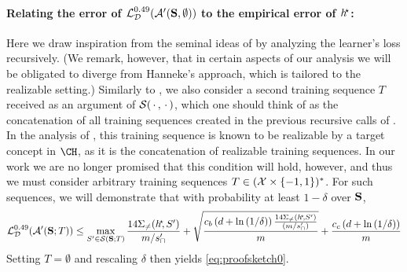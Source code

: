 {}

\paragraph{Relating the error of $ \operatorname{\mathcal{L}}_{\mathcal{D}}^{0.49}(\mathcal{A}'(\mathbf{S},\emptyset)) $ to the empirical error of $ h^{\negmedspace\star} $:}
Here we draw inspiration from the seminal ideas of \cite{hanneke2016optimal} by analyzing the learner's loss recursively. (We remark, however, that in certain aspects of our analysis we will be obligated to diverge from Hanneke's approach, which is tailored to the realizable setting.) 
Similarly to \citet{hanneke2016optimal}, we also consider a second training sequence $T$ received as an argument of $ \mathcal{S}(\, \cdot \,, \, \cdot \,) $, which one should think of as the concatenation of all training sequences created in the previous recursive calls of . 
In the analysis of \cite{hanneke2016optimal}, this training sequence is known to be realizable by a target concept in $\CH$, as it is the concatenation of realizable training sequences. 
In our work we are no longer promised that this condition will hold, however, and thus we must consider arbitrary training sequences $ T\in (\mathcal{X}\times \{-1,1  \} )^{*}$. For such sequences,
 we will demonstrate that with probability at least $ 1-\delta $ over $ \mathbf{S} $, 
\begin{align}\label{eq:proofsketch3}
    \operatorname{\mathcal{L}}_{\mathcal{D}}^{0.49}(\mathcal{A}'(\mathbf{S};T))
    \leq  \max\limits_{S'\in\mathcal{S}(\mathbf{S};T)}\frac{14\Sigma_{\not=}(h^{\negmedspace\star}\negmedspace,S')}{m/s_{\sqcap}'}+\sqrt{\frac{c_b\left(d+\ln{(1/\delta )}\right)\frac{14\Sigma_{\not=}(h^{\negmedspace\star}\negmedspace,S')}{(m/s_{\sqcap}')}}{m}}+\frac{c_c\left(d+\ln{(1/\delta )}\right)}{m}
\end{align}
Setting $ T=\emptyset $ and rescaling $\delta$ then yields \cref{eq:proofsketch0}.

